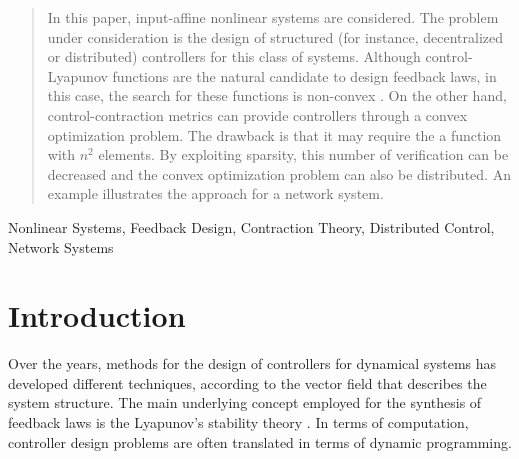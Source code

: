 \documentclass[10pt,twocolumn,twoside]{IEEEtran}
\theoremstyle{plain}
\theoremstyle{definition}
\theoremstyle{remark}
\begin{document}
\maketitle

\begin{abstract}
In this paper, input-affine nonlinear systems are considered. The problem under consideration is the design of structured (for instance, decentralized or distributed) controllers for this class of systems. Although control-Lyapunov functions are the natural candidate to design feedback laws, in this case, the search for these functions is non-convex \cite{Rantzer:2001}. On the other hand, control-contraction metrics can provide controllers through a convex optimization problem. The drawback is that it may require the a function with $n^2$ elements. By exploiting sparsity, this number of verification can be decreased and the convex optimization problem can also be distributed. An example illustrates the approach for a network system.
\end{abstract}

\begin{IEEEkeywords}
Nonlinear Systems, Feedback Design, Contraction Theory, Distributed Control, Network Systems
\end{IEEEkeywords}






%
\IEEEpeerreviewmaketitle



\section{Introduction}

Over the years, methods for the design of controllers for dynamical systems has developed different techniques, according to the vector field that describes the system structure. The main underlying concept employed for the synthesis of feedback laws is the Lyapunov's stability theory \cite{Bhatia1970,Rouche:1977}. In terms of computation, controller design problems are often translated in terms of dynamic programming.
\end{document}
